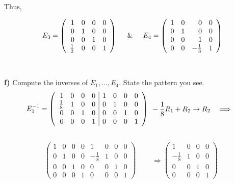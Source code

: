 \documentclass{article}
\begin{document}
Thus,

\[
E_3 = 
\left(
\begin{array}{rrrr}
1 & 0 & 0 & 0 \\
0 & 1 & 0 & 0 \\
0 & 0 & 1 & 0 \\
\frac{1}{2} & 0 & 0 & 1 
\end{array}
\right)
\hspace{0.5cm} \& \hspace{0.5cm}
E_4 = 
\left(
\begin{array}{rrrr}
1 & 0 & 0 & 0 \\
0 & 1 & 0 & 0 \\
0 & 0 & 1 & 0 \\
0 & 0 & -\frac{1}{3} & 1 
\end{array}
\right)
\]\\\\

{\bf f)} Compute the inverses of $E_1, \ldots, E_4$. State the pattern you see. \\

\[
E_1^{-1} = 
\left(
\begin{array}{rrrr|rrrr}
1 & 0 & 0 & 0 & 1 & 0 & 0 & 0 \\
\frac{1}{8} & 1 & 0 & 0 & 0 & 1 & 0 & 0 \\
0 & 0 & 1 & 0 & 0 & 0 & 1 & 0 \\
0 & 0 & 0 & 1 & 0 & 0 & 0 & 1 
\end{array}
\right)
\hspace{0.1cm}
\begin{aligned}
& -\frac{1}{8}R_1 + R_2 \rightarrow R_2 \quad\Longrightarrow
\end{aligned}
\]\\

\[
\left(
\begin{array}{rrrr|rrrr}
1 & 0 & 0 & 0 & 1 & 0 & 0 & 0 \\
0 & 1 & 0 & 0 & -\frac{1}{8} & 1 & 0 & 0 \\
0 & 0 & 1 & 0 & 0 & 0 & 1 & 0 \\
0 & 0 & 0 & 1 & 0 & 0 & 0 & 1 
\end{array}
\right)
\begin{aligned}
& \quad\Longrightarrow
\left(
\begin{array}{rrrr}
1 & 0 & 0 & 0 \\
-\frac{1}{8} & 1 & 0 & 0 \\
0 & 0 & 1 & 0 \\
0 & 0 & 0 & 1 
\end{array}
\right)
\end{aligned}
\]\\
\end{document}

